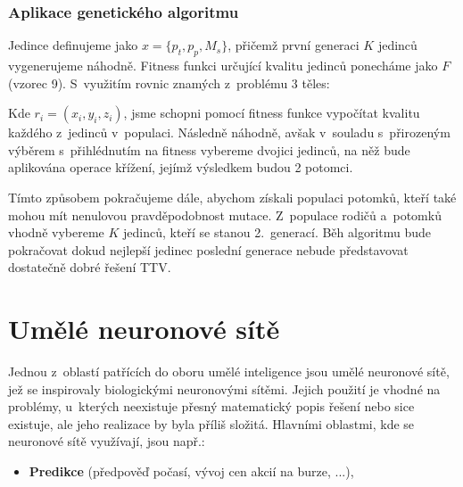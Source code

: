 \documentclass[a4paper,12pt]{article}
\begin{document}
{{{\subsubsection{Aplikace genetického algoritmu}

Jedince definujeme jako $x = \{p_t, p_p, M_s\}$, přičemž první generaci $K$ jedinců vygenerujeme náhodně. Fitness funkci určující kvalitu jedinců ponecháme jako $F$ (vzorec 9). S~využitím rovnic znamých z~problému 3 těles:


Kde $r_i = (x_i, y_i, z_i)$, jsme schopni pomocí fitness funkce vypočítat kvalitu každého z~jedinců v~populaci. Následně náhodně, avšak v~souladu s~přirozeným výběrem s~přihlédnutím na fitness vybereme dvojici jedinců, na něž bude aplikována operace křížení, jejímž výsledkem budou 2 potomci.~\cite{ttv}

Tímto způsobem pokračujeme dále, abychom získali populaci potomků, kteří také mohou mít nenulovou pravděpodobnost mutace. Z~populace rodičů a~potomků vhodně vybereme $K$ jedinců, kteří se stanou 2.~generací. Běh algoritmu bude pokračovat dokud nejlepší jedinec poslední generace nebude představovat dostatečně dobré řešení TTV.

\drawgimp

\section{Umělé neuronové sítě}

Jednou z~oblastí patřících do oboru umělé inteligence jsou umělé neuronové sítě, jež se inspirovaly biologickými neuronovými sítěmi. Jejich použití je vhodné na problémy, u~kterých neexistuje přesný matematický popis řešení nebo sice existuje, ale jeho realizace by byla příliš složitá. Hlavními oblastmi, kde se neuronové sítě využívají, jsou např.:

\begin{itemize}
\item \textbf{Predikce} (předpověď počasí,  vývoj cen akcií na burze, ...),


\end{itemize}}}}
\end{document}
